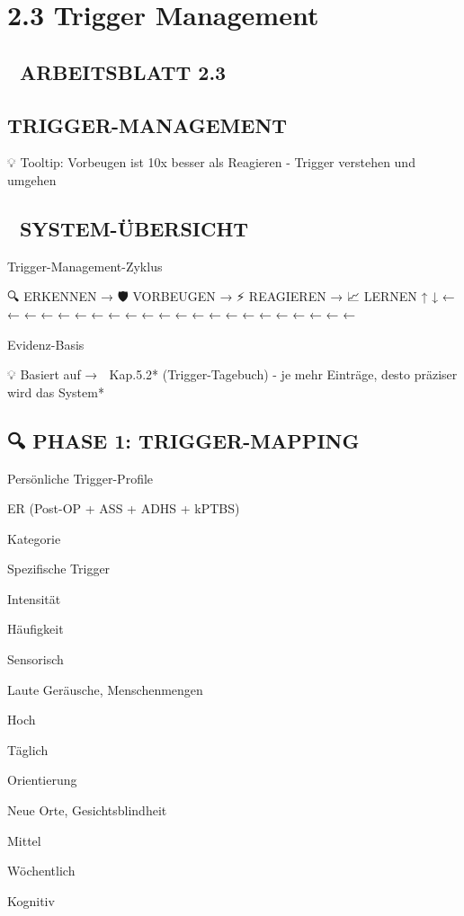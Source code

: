 \section{2.3 Trigger Management}

\subsection{🎢 ARBEITSBLATT 2.3}

\subsection{TRIGGER-MANAGEMENT}

💡 Tooltip: Vorbeugen ist 10x besser als Reagieren - Trigger verstehen und umgehen

\subsection{🎯 SYSTEM-ÜBERSICHT}

Trigger-Management-Zyklus

🔍 ERKENNEN → 🛡️ VORBEUGEN → ⚡ REAGIEREN → 📈 LERNEN    ↑                                           ↓    ← ← ← ← ← ← ← ← ← ← ← ← ← ← ← ← ← ← ← ← ← ←

Evidenz-Basis

💡 Basiert auf → 📝 Kap.5.2* (Trigger-Tagebuch) - je mehr Einträge, desto präziser wird das System*

\subsection{🔍 PHASE 1: TRIGGER-MAPPING}

Persönliche Trigger-Profile

ER (Post-OP + ASS + ADHS + kPTBS)

Kategorie

Spezifische Trigger

Intensität

Häufigkeit

Sensorisch

Laute Geräusche, Menschenmengen

Hoch

Täglich

Orientierung

Neue Orte, Gesichtsblindheit

Mittel

Wöchentlich

Kognitiv

